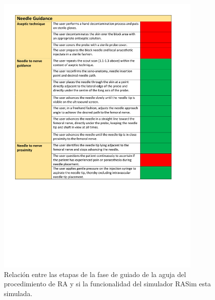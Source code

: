 \begin{figure}[ht]
    \centering
    \includegraphics[trim={1cm 85mm 1cm 1cm},clip,width=0.9\textwidth]{PDFs/RA2.pdf}
       \caption{Relación entre las etapas de la fase de guiado de la aguja del procedimiento de \acs{RA} y si la funcionalidad del simulador \acs{RASim} esta simulada.\label{fig:RAsteps2} }
    
\end{figure}
